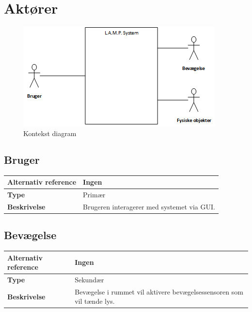 \section{Aktører}

\begin{figure}[H] \centering
    \includegraphics[width=\textwidth]{0_Filer/Figuer/AktoerKontekstLAMP.png}
    \caption{Kontekst diagram}
    \label{fig:kontekstdiagram}
\end{figure}

\begin{table}[H] \centering
\subsection{Bruger}
\begin{tabular}{|p{4cm}|p{8cm}|}
	\hline
	    \textbf{Alternativ reference}   & Ingen \\ \hline
	    \textbf{Type}                   & Primær \\ \hline
		\textbf{Beskrivelse}            & Brugeren interagerer med systemet via GUI. \\ \hline
	\end{tabular}
\end{table}

\begin{table}[H] \centering
\subsection{Bevægelse}
    \begin{tabular}{|p{4cm}|p{8cm}|}
	\hline
	    \textbf{Alternativ reference}   & Ingen \\ \hline
	    \textbf{Type}                   & Sekundær \\ \hline
		\textbf{Beskrivelse}            & Bevægelse i rummet vil aktivere bevægelsessensoren som vil tænde lys. \\ \hline
	\end{tabular}
\end{table}

